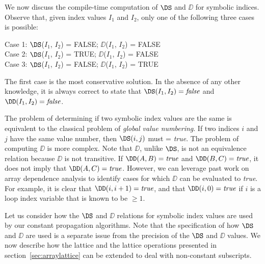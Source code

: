 We now discuss the compile-time
computation of $\DS$ and $\DD$ for symbolic
indices. 
Observe that,
given index values $I_1$ and $I_2$, only one of the following three cases
is possible:
\begin{center}
\parbox{3.0in}{
\begin{programa}
Case 1:   $\DS$($I_1$, $I_2$) = FALSE; $\DD$($I_1$, $I_2$) = FALSE \\
Case 2:   $\DS$($I_1$, $I_2$) = TRUE; $\DD$($I_1$, $I_2$) = FALSE \\
Case 3:   $\DS$($I_1$, $I_2$) = FALSE; $\DD$($I_1$, $I_2$) = TRUE \\
\end{programa}
}
\end{center}
The first case is the most conservative solution.  In the absence of
any other knowledge, it is always correct to state that
$\DS(I_1,I_2) = \mbox{\it false}$ and $\DD(I_1,I_2) = \mbox{\it
false}$.

The problem of determining
if two symbolic index values are the same is equivalent to the
classical problem of {\it global value numbering}. If two indices $i$
and $j$ have the same value number, then $\DS(i,j)$ must = {\it true}.
The problem of computing
$\DD$ is more complex. Note that $\DD$, unlike $\DS$, is not an
equivalence relation because $\DD$ is not transitive.
If $\DD(A, B)=\mbox{\it true}$
and $\DD(B, C)=\mbox{\it true}$, it does
not imply that $\DD(A, C)=\mbox{\it true}$.  
However, we can leverage past work on array dependence analysis
to identify cases for which $\DD$ can be
evaluated to {\it true}.  For example, it is clear that $\DD(i,
i+1) = \mbox{\it true}$,
and that $\DD(i, 0) = \mbox{\it true}$ if $i$ is a loop index variable
that is known to be $\geq 1$.

Let us consider how the $\DS$ and $\DD$ relations for 
symbolic index values
are used by our constant
propagation algorithms.  Note that the specification of how $\DS$ and $\DD$
are used is a separate issue from the precision of
the $\DS$ and $\DD$ values.
We now describe how 
the lattice and the lattice operations presented in
section~\ref{sec:arraylattice} can be extended
to deal with non-constant subscripts.

